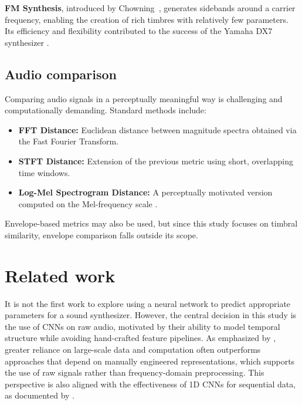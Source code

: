 \documentclass[10pt,conference]{IEEEtran}
\begin{document}
\textbf{FM Synthesis}, introduced by Chowning~\cite{chowning1973synthesis}, generates sidebands around a carrier frequency, enabling the creation of rich timbres with relatively few parameters. Its efficiency and flexibility contributed to the success of the Yamaha DX7 synthesizer \cite{steinmetz2022ddx7, lazzarini2023higherorder}.

\subsection{Audio comparison}

Comparing audio signals in a perceptually meaningful way is challenging and computationally demanding. Standard methods \cite{claesson2021resynthesis} include:

\begin{itemize}
    \item \textbf{FFT Distance:} Euclidean distance between magnitude spectra obtained via the Fast Fourier Transform.
    \item \textbf{STFT Distance:} Extension of the previous metric using short, overlapping time windows.
    \item \textbf{Log-Mel Spectrogram Distance:} A perceptually motivated version computed on the Mel-frequency scale \cite{claesson2021resynthesis,chulev2024improving}.
\end{itemize}

Envelope-based metrics may also be used, but since this study focuses on timbral similarity, envelope comparison falls outside its scope.

\section{Related work} \label{sec:related}

It is not the first work to explore using a neural network to predict appropriate parameters for a sound synthesizer. However, the central decision in this study is the use of CNNs on raw audio, motivated by their ability to model temporal structure while avoiding hand-crafted feature pipelines. As emphasized by \cite{sutton2019bitterlesson}, greater reliance on large-scale data and computation often outperforms approaches that depend on manually engineered representations, which supports the use of raw signals rather than frequency-domain preprocessing. This perspective is also aligned with the effectiveness of 1D CNNs for sequential data, as documented by \cite{kiranyaz2021survey}.
\end{document}
